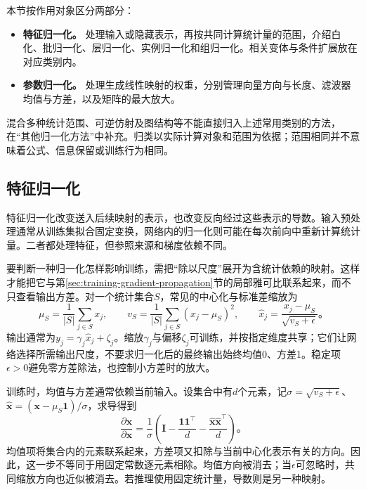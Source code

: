 本节按作用对象区分两部分：
\begin{itemize}
  \item \textbf{特征归一化。} 处理输入或隐藏表示，再按共同计算统计量的范围，介绍白化、批归一化、层归一化、实例归一化和组归一化。相关变体与条件扩展放在对应类别内。
  \item \textbf{参数归一化。} 处理生成线性映射的权重，分别管理向量方向与长度、滤波器均值与方差，以及矩阵的最大放大。
\end{itemize}
混合多种统计范围、可逆仿射及图结构等不能直接归入上述常用类别的方法，在“其他归一化方法”中补充。归类以实际计算对象和范围为依据；范围相同并不意味着公式、信息保留或训练行为相同。

\subsection{特征归一化}
\label{sec:training-feature-normalization-methods}
\label{sec:training-normalization-principles}
特征归一化改变送入后续映射的表示，也改变反向经过这些表示的导数。输入预处理通常从训练集拟合固定变换，网络内的归一化则可能在每次前向中重新计算统计量。二者都处理特征，但参照来源和梯度依赖不同。

要判断一种归一化怎样影响训练，需把“除以尺度”展开为含统计依赖的映射。这样才能把它与第\ref{sec:training-gradient-propagation}节的局部雅可比联系起来，而不只查看输出方差。对一个统计集合$S$，常见的中心化与标准差缩放为
\begin{equation}
  \mu_S=\frac1{|S|}\sum_{j\in S}x_j,\qquad
  v_S=\frac1{|S|}\sum_{j\in S}(x_j-\mu_S)^2,\qquad
  \hat x_j=\frac{x_j-\mu_S}{\sqrt{v_S+\epsilon}}\text{。}
  \label{eq:training-normalization-common}
\end{equation}
输出通常为$y_j=\gamma_j\hat x_j+\zeta_j$。缩放$\gamma_j$与偏移$\zeta_j$可训练，并按指定维度共享；它们让网络选择所需输出尺度，不要求归一化后的最终输出始终均值0、方差1。稳定项$\epsilon>0$避免零方差除法，也控制小方差时的放大。

训练时，均值与方差通常依赖当前输入。设集合中有$d$个元素，记$\sigma=\sqrt{v_S+\epsilon}$、$\hat{\bm x}=(\bm x-\mu_S\bm1)/\sigma$，求导得到
\begin{equation}
  \frac{\partial\hat{\bm x}}{\partial\bm x}
  =\frac1\sigma\left(\bm I-\frac{\bm1\bm1^{\top}}d
                          -\frac{\hat{\bm x}\hat{\bm x}^{\top}}d\right)\text{。}
  \label{eq:training-normalization-jacobian}
\end{equation}
均值项将集合内的元素联系起来，方差项又扣除与当前中心化表示有关的方向。因此，这一步不等同于用固定常数逐元素相除。均值方向被消去；当$\epsilon$可忽略时，共同缩放方向也近似被消去。若推理使用固定统计量，导数则是另一种映射。

